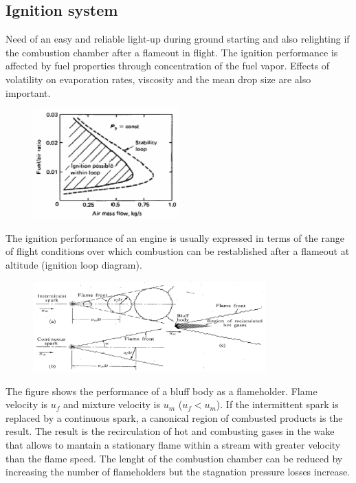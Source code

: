 \documentclass[12pt]{article}
\begin{document}
\subsection{Ignition system}

Need of an easy and reliable light-up during ground starting and also relighting if the combustion chamber after a flameout in flight. The ignition performance is affected by fuel properties through concentration of the fuel vapor. Effects of volatility on evaporation rates, viscosity and the mean drop size are also important.

\begin{figure}[!ht]
\centering
\includegraphics[width=0.5\textwidth]{figures/ignitionloop.png}
\end{figure}

The ignition performance of an engine is usually expressed in terms of the range of flight conditions over which combustion can be restablished after a flameout at altitude (ignition loop diagram).

\begin{figure}[!ht]
\centering
\includegraphics[width=0.8\textwidth]{figures/flameholder.png}
\end{figure}

The figure shows the performance of a bluff body as a flameholder. Flame velocity is $u_{f}$ and mixture velocity is $u_{m}$ ($u_{f}<u_{m}$). If the intermittent spark is replaced by a continuous spark, a canonical region of combusted products is the result. The result is the recirculation of hot and combusting gases in the wake that allows to mantain a stationary flame within a stream with greater velocity than the flame speed. The lenght of the combustion chamber can be reduced by increasing the number of flameholders but the stagnation pressure losses increase.
\end{document}
